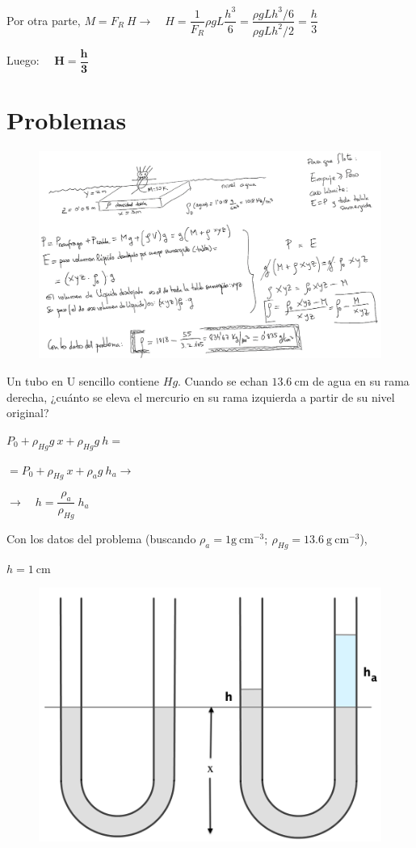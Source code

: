 Por otra parte, $M=F_R\ H \to \quad H=\dfrac 1{F_R} \rho g L \dfrac{h^3}6=\dfrac{\rho g L h^3 / 6}{\rho g L h^2/2}=\dfrac h 3$

Luego: $\quad \boldsymbol{H=\dfrac h 3}$

\section{Problemas}
\begin{prob}	
\end{prob}
\begin{figure}[H]
	\centering
	\includegraphics[width=1\textwidth]{imagenes/imagenes07/T07IM18.png}
\end{figure}

\begin{prob}
Un tubo en U sencillo contiene $Hg$. Cuando se echan $13.6\ \mathrm{cm}$ de agua en su rama derecha, ¿cuánto se eleva el mercurio en su rama izquierda a partir de su nivel original?	
\end{prob}
\begin{multicols}{2}
$P_0+\rho_{Hg}g \ x+\rho_{Hg}g\ h=$

$=P_0 + \rho_{Hg} \ x + \rho_a g \ h_a \to$

$\to \quad h=\dfrac {\rho_a}{\rho_{Hg}}\ h_a $

Con los datos del problema (buscando $\rho_a=1 \mathrm{g}\ \mathrm{cm}^{-3}; \ \rho_{Hg}=13.6 \ \mathrm{g\ cm}^{-3}$),

$h=1\ \mathrm{cm}$
\begin{figure}[H]
	\centering
	\includegraphics[width=.5\textwidth]{imagenes/imagenes07/T07IM19.png}
\end{figure}	
\end{multicols}

